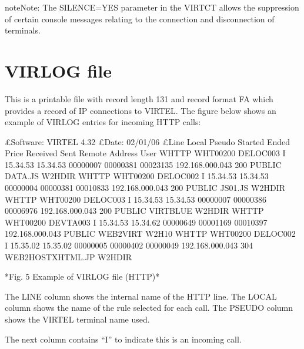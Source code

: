 \documentclass[letterpaper,10pt,english]{sphinxmanual}
\begin{document}
\begin{sphinxadmonition}{note}{Note:}
\sphinxAtStartPar
The SILENCE=YES parameter in the VIRTCT allows the suppression of certain console messages relating to the connection and disconnection of terminals.
\end{sphinxadmonition}

\sphinxAtStartPar
{}

\ignorespaces 

\section{VIRLOG file}
\label{\detokenize{audit_operations_ and_performance:virlog-file}}\label{\detokenize{audit_operations_ and_performance:index-75}}
\sphinxAtStartPar
This is a printable file with record length 131 and record format FA which provides a record of IP connections to VIRTEL. The figure below shows an example of VIRLOG entries for incoming
HTTP calls:

\begin{sphinxVerbatim}[commandchars=\\\{\}]
£Software: VIRTEL 4.32
£Date: 02/01/06
£Line Local Pseudo Started Ended Price Received Sent Remote Address User
W\PYGZhy{}HTTP WHT00200 DELOC003 I 15.34.53 15.34.53 00000007 00000381 00023135 192.168.000.043 200 PUBLIC DATA.JS W2H\PYGZhy{}DIR
W\PYGZhy{}HTTP WHT00200 DELOC002 I 15.34.53 15.34.53 00000004 00000381 00010833 192.168.000.043 200 PUBLIC JS01.JS W2H\PYGZhy{}DIR
W\PYGZhy{}HTTP WHT00200 DELOC003 I 15.34.53 15.34.53 00000007 00000386 00006976 192.168.000.043 200 PUBLIC VIRTBLUE W2H\PYGZhy{}DIR
W\PYGZhy{}HTTP WHT00200 DEVTA003 I 15.34.53 15.34.62 00000649 00001169 00010397 192.168.000.043 PUBLIC WEB2VIRT W2H\PYGZhy{}10
W\PYGZhy{}HTTP WHT00200 DELOC002 I 15.35.02 15.35.02 00000005 00000402 00000049 192.168.000.043 304 WEB2HOSTXHTML.JP W2H\PYGZhy{}DIR

*Fig. 5 Example of VIRLOG file (HTTP)*
\end{sphinxVerbatim}

\sphinxAtStartPar
The LINE column shows the internal name of the HTTP line.
The LOCAL column shows the name of the rule selected for each call.
The PSEUDO column shows the VIRTEL terminal name used.

\sphinxAtStartPar
The next column contains “I” to indicate this is an incoming call.
\end{document}
